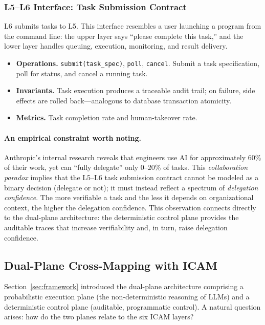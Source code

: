 \documentclass[11pt,a4paper]{article}
\begin{document}
\subsubsection{L5--L6 Interface: Task Submission Contract}

L6 submits tasks to L5. This interface resembles a user launching a program from the command line: the upper layer says ``please complete this task,'' and the lower layer handles queuing, execution, monitoring, and result delivery.

\begin{itemize}[nosep]
\item \textbf{Operations.}
\texttt{submit(task\_spec)}, \texttt{poll}, \texttt{cancel}.
Submit a task specification, poll for status, and cancel a running task.
\item \textbf{Invariants.}
Task execution produces a traceable audit trail; on failure, side effects are rolled back---analogous to database transaction atomicity.
\item \textbf{Metrics.}
Task completion rate and human-takeover rate.
\end{itemize}

\paragraph{An empirical constraint worth noting.}
Anthropic's internal research reveals that engineers use AI for approximately 60\% of their work, yet can ``fully delegate'' only 0--20\% of tasks\cite{anthropic2026agenticreport}.
This \textit{collaboration paradox} implies that the L5--L6 task submission contract cannot be modeled as a binary decision (delegate or not); it must instead reflect a spectrum of \textit{delegation confidence}. The more verifiable a task and the less it depends on organizational context, the higher the delegation confidence.
This observation connects directly to the dual-plane architecture: the deterministic control plane provides the auditable traces that increase verifiability and, in turn, raise delegation confidence.

\subsection{Dual-Plane Cross-Mapping with ICAM}
\label{sec:dual-plane-icam}

Section~\ref{sec:framework} introduced the dual-plane architecture comprising a probabilistic execution plane (the non-deterministic reasoning of LLMs) and a deterministic control plane (auditable, programmatic control). A natural question arises: how do the two planes relate to the six ICAM layers?
\end{document}
